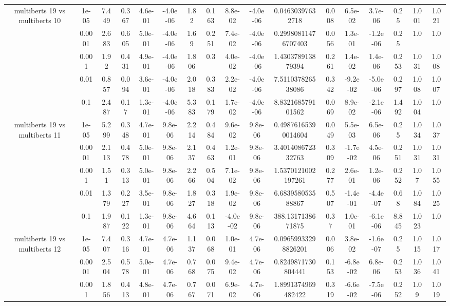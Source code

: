 \begin{tabular}{|c|c|c|c|c|c|c|c|c|c|c|c|c|c|c|c|c|}
\hline
\multirow{5}{*}{multiberts 19 vs multiberts 10} & 1e-05 & 7.449 & 0.367 & 4.6e-01 & -4.0e-06 & 1.82 & 0.163 & 8.8e-02 & -4.0e-06 & 0.04630397632718 & 0.008 & 6.5e-02 & 3.7e-06 & 0.25 & 1.001 & 1.021 \\
 & 0.0001 & 2.683 & 0.605 & 5.0e-01 & -4.0e-06 & 1.69 & 0.251 & 7.4e-02 & -4.0e-06 & 0.29980811476707403 & 0.056 & 1.3e-01 & -1.2e-06 & 0.25 & 1.0 & 1.0 \\
 & 0.001 & 1.92 & 0.431 & 4.9e-01 & -4.0e-06 & 1.806 & 0.3 & 4.0e-02 & -4.0e-06 & 1.430378913879394 & 0.261 & 1.4e-02 & 1.4e-06 & 0.253 & 1.031 & 1.008 \\
 & 0.01 & 0.857 & 0.094 & 3.6e-01 & -4.0e-06 & 2.018 & 0.383 & 2.2e-02 & -4.0e-06 & 7.511037826538086 & 0.342 & -9.2e-02 & -5.0e-06 & 0.297 & 1.008 & 1.007 \\
 & 0.1 & 2.487 & 0.17 & 1.3e-01 & -4.0e-06 & 5.383 & 0.179 & 1.7e-02 & -4.0e-06 & 8.832168579101562 & 0.069 & 8.9e-02 & -2.1e-06 & 1.492 & 1.004 & 1.0 \\
\hline
\multirow{5}{*}{multiberts 19 vs multiberts 11} & 1e-05 & 5.299 & 0.348 & 4.7e-01 & 9.8e-06 & 2.214 & 0.484 & 9.6e-02 & 9.8e-06 & 0.49876165390014604 & 0.049 & 5.5e-03 & 6.5e-06 & 0.25 & 1.034 & 1.037 \\
 & 0.0001 & 2.113 & 0.478 & 5.0e-01 & 9.8e-06 & 2.137 & 0.463 & 1.2e-01 & 9.8e-06 & 3.401408672332763 & 0.309 & -1.7e-02 & 4.5e-06 & 0.251 & 1.031 & 1.031 \\
 & 0.001 & 1.51 & 0.313 & 5.0e-01 & 9.8e-06 & 2.266 & 0.504 & 7.1e-02 & 9.8e-06 & 1.5370121002197261 & 0.277 & 2.6e-01 & 1.2e-06 & 0.252 & 1.07 & 1.055 \\
 & 0.01 & 1.379 & 0.227 & 3.5e-01 & 9.8e-06 & 1.827 & 0.318 & 1.9e-02 & 9.8e-06 & 6.683958053588867 & 0.507 & -1.4e-01 & -4.4e-07 & 0.68 & 1.084 & 1.025 \\
 & 0.1 & 1.987 & 0.122 & 1.3e-01 & 9.8e-06 & 4.664 & 0.113 & -4.0e-02 & 9.8e-06 & 388.1317138671875 & 0.37 & 1.0e-01 & -6.1e-06 & 8.845 & 1.023 & 1.0 \\
\hline
\multirow{5}{*}{multiberts 19 vs multiberts 12} & 1e-05 & 7.407 & 0.316 & 4.7e-01 & 4.7e-06 & 1.137 & 0.068 & 1.0e-01 & 4.7e-06 & 0.09659933298826201 & 0.006 & 3.8e-02 & -1.6e-07 & 0.25 & 1.015 & 1.017 \\
 & 0.0001 & 2.504 & 0.578 & 5.0e-01 & 4.7e-06 & 0.768 & 0.075 & 9.4e-02 & 4.7e-06 & 0.8249871730804441 & 0.153 & -6.8e-02 & 6.8e-06 & 0.253 & 1.036 & 1.041 \\
 & 0.001 & 1.856 & 0.413 & 4.8e-01 & 4.7e-06 & 0.767 & 0.071 & 6.9e-02 & 4.7e-06 & 1.8991374969482422 & 0.319 & -6.6e-02 & -7.5e-06 & 0.252 & 1.09 & 1.019 \\

\end{tabular}
